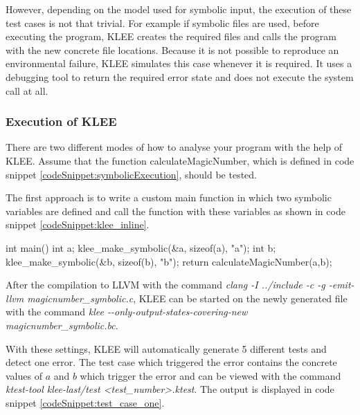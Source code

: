 However, depending on the model used for symbolic input, the execution of these test cases is not that trivial. For example if symbolic files are used, before executing the program, KLEE creates the required files and calls the program with the new concrete file locations. 
Because it is not possible to reproduce an environmental failure, KLEE simulates this case whenever it is required. It uses a debugging tool to return the required error state and does not execute the system call at all.

\subsubsection{Execution of KLEE}
There are two different modes of how to analyse your program with the help of KLEE. Assume that the function calculateMagicNumber, which is defined in code snippet \ref{codeSnippet:symbolicExecution}, should be tested.

The first approach is to write a custom main function in which two symbolic variables are defined and call the function with these variables as shown in code snippet \ref{codeSnippet:klee_inline}.
\begin{codesnippet}[caption={Main function which defines two symbolic variables and calls the function calculateMagicNumber of code snippet \ref{codeSnippet:symbolicExecution}}, label={codeSnippet:klee_inline}]
int main() {
  int a;
  klee_make_symbolic(&a, sizeof(a), "a");
  int b;
  klee_make_symbolic(&b, sizeof(b), "b");
  return calculateMagicNumber(a,b);
}
\end{codesnippet}

After the compilation to LLVM with the command \textit{clang -I ../include -c -g -emit-llvm magicnumber\_symbolic.c}, KLEE can be started on the newly generated file with the command \textit{klee -{}-only-output-states-covering-new magicnumber\_symbolic.bc}.

With these settings, KLEE will automatically generate 5 different tests and detect one error. 
The test case which triggered the error contains the concrete values of $a$ and $b$ which trigger the error and can be viewed with the command \textit{ktest-tool klee-last/test \textless test\_number\textgreater.ktest}.
The output is displayed in code snippet \ref{codeSnippet:test_case_one}.

